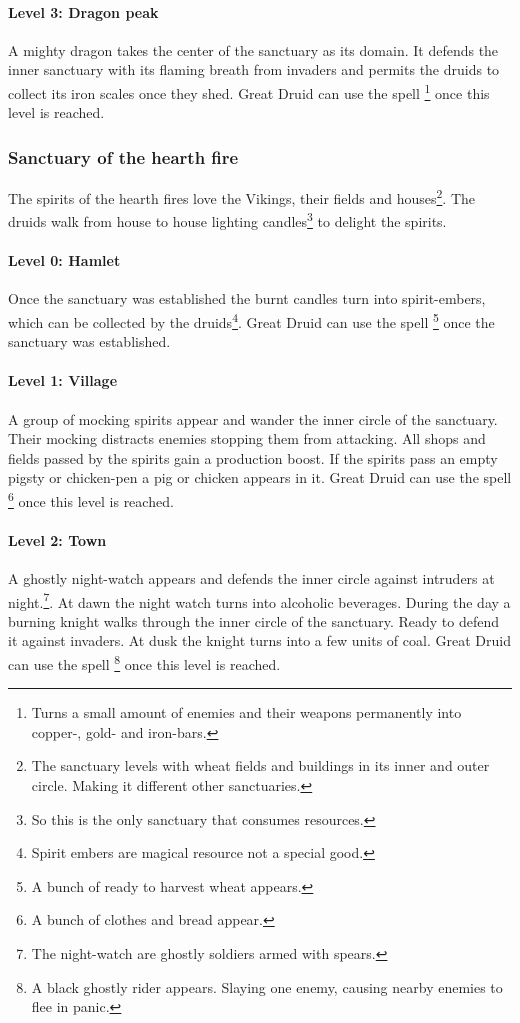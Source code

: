 \paragraph{Level 3: Dragon peak}
A mighty dragon takes the center of the sanctuary as its domain. It defends the
inner sanctuary with its flaming breath from invaders and permits the druids to
collect its iron scales once they shed. Great Druid can use the spell
\footnote{ Turns a small amount of enemies and their
	weapons permanently into copper-, gold- and iron-bars. } once this level is
reached.

\subsubsection{Sanctuary of the hearth fire}
The spirits of the hearth fires love the \gls{Vikings}, their fields and
houses\footnote{ The sanctuary levels with wheat fields and buildings in its
	inner and outer circle. Making it different other sanctuaries. }. The druids
walk from house to house lighting candles\footnote{ So this is the only
	sanctuary that consumes resources. } to delight the spirits.

\paragraph{Level 0: Hamlet}
Once the sanctuary was established the burnt candles turn into spirit-embers,
which can be collected by the druids\footnote{ Spirit embers are magical
	resource not a special good. }. Great Druid can use the spell
\footnote{ A bunch of ready to harvest wheat
	appears. } once the sanctuary was established.

\paragraph{Level 1: Village}
A group of mocking spirits appear and wander the inner circle of the sanctuary.
Their mocking distracts enemies stopping them from attacking. All shops and
fields passed by the spirits gain a production boost. If the spirits pass an
empty pigsty or chicken-pen a pig or chicken appears in it. Great Druid can use
the spell \footnote{ A bunch of clothes and bread
	appear. } once this level is reached.

\paragraph{Level 2: Town}
A ghostly night-watch appears and defends the inner circle against intruders at
night.\footnote{ The night-watch are ghostly soldiers armed with spears. }. At
dawn the night watch turns into alcoholic beverages. During the day a burning
knight walks through the inner circle of the sanctuary. Ready to defend it
against invaders. At dusk the knight turns into a few units of coal. Great
Druid can use the spell \footnote{ A black ghostly rider
	appears. Slaying one enemy, causing nearby enemies to flee in panic. } once
this level is reached.

